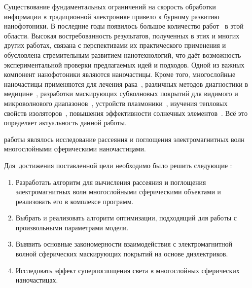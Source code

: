 {\actuality} Существование фундаментальных ограничений на скорость
обработки информации в традиционной электронике привело к бурному
развитию нанофотоники. В последние годы появилось большое количество
работ~\cite{Tame-quantum-plasmonics-2013,
  Javier-graphene-plasmonics-2014, Khurgin-loss-plasmonics-2015,
  He-tunable-terahertz-graphene-metamaterials-2015,
  Segal-meta-nonlinar-PhC-2015,
  Poddubny-hyperbolic-metamaterials-2013, Kildishev-metasurface-2013}
в этой области.  Высокая востребованность результатов, полученных в
этих и многих других работах, связана с перспективами их практического
применения и обусловлена стремительным развитием нанотехнологий, что
даёт возможность экспериментальной проверки предлагаемых идей и
подходов. Одной из важных компонент нанофотоники являются наночастицы.
Кроме того, многослойные наночастицы применяются для лечения
рака~\cite{Zhang-2010, Hirsch-2003}, различных методов диагностики в
медицине~\cite{Allain-2002}, разработки маскирующих субволновых
покрытий для видимого и микроволнового диапазонов~\cite{Qui-2009,
  Semouchkina-2013}, устройств плазмоники~\cite{Martin-2013,
  Alu-2005}, изучения тепловых свойств изоляторов~\cite{Xie-2013},
повышения эффективности солнечных элементов~\cite{Kameya-2011,
  Mann-2011}.  Всё это определяет актуальность данной работы.

  
{\aim} работы являлось %
исследование рассеяния и поглощения электромагнитных волн многослойными
сферическими наночастицами.

Для~достижения поставленной цели необходимо было решить следующие {\tasks}:
\begin{enumerate}
  \item Разработать алгоритм для вычисления рассеяния и поглощения
    электромагнитных волн
    многослойными сферическими объектами и реализовать его в комплексе программ.
  \item Выбрать и реализовать алгоритм оптимизации, подходящий для
    работы с произвольными параметрами модели.%
  \item Выявить основные закономерности взаимодействия с
    электромагнитной волной сферических маскирующих покрытий на
    основе диэлектриков.
  \item Исследовать эффект суперпоглощения света в многослойных
    сферических наночастицах.
\end{enumerate}

